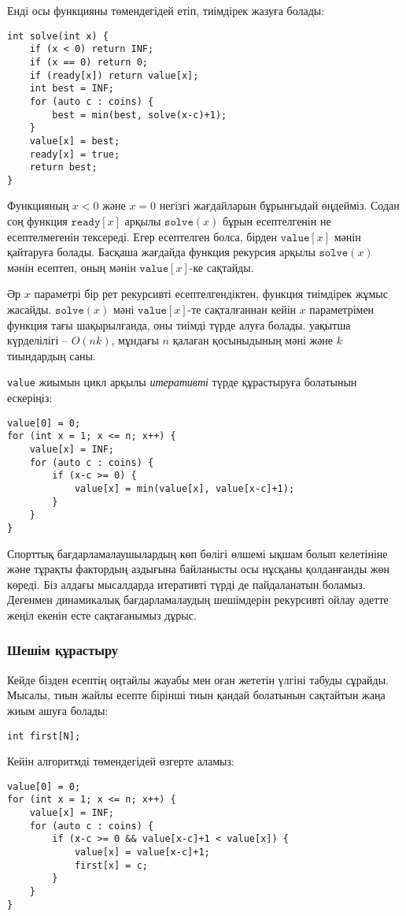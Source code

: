 Енді осы функцияны төмендегідей етіп, тиімдірек
жазуға болады:

\begin{lstlisting}
int solve(int x) {
    if (x < 0) return INF;
    if (x == 0) return 0;
    if (ready[x]) return value[x];
    int best = INF;
    for (auto c : coins) {
        best = min(best, solve(x-c)+1);
    }
    value[x] = best;
    ready[x] = true;
    return best;
}
\end{lstlisting}

Функцияның $x<0$ және $x=0$ негізгі жағдайларын 
бұрынғыдай өңдейміз. Содан соң функция
$\texttt{ready}[x]$ арқылы 
$\texttt{solve}(x)$ бұрын есептелгенін не есептелмегенін тексереді.
Егер есептелген болса, бірден $\texttt{value}[x]$
мәнін қайтаруға болады. Басқаша жағдайда функция рекурсия арқылы
$\texttt{solve}(x)$ мәнін есептеп, оның мәнін 
$\texttt{value}[x]$-ке сақтайды. 

Әр $x$ параметрі бір рет рекурсивті есептелгендіктен,
функция тиімдірек жұмыс жасайды. $\texttt{solve}(x)$ мәні 
$\texttt{value}[x]$-те сақталғаннан кейін
$x$ параметрімен функция тағы шақырылғанда, 
оны тиімді түрде алуға болады. уақытша күрделілігі
-- $O(nk)$, мұндағы $n$ қалаған қосыныдының мәні 
және $k$ тиындардың саны. 

\texttt{value} жиымын 
цикл арқылы \emph{итеративті} түрде
құрастыруға болатынын ескеріңіз:

\begin{lstlisting}
value[0] = 0;
for (int x = 1; x <= n; x++) {
    value[x] = INF;
    for (auto c : coins) {
        if (x-c >= 0) {
            value[x] = min(value[x], value[x-c]+1);
        }
    }
}
\end{lstlisting}

Спорттық бағдарламалаушылардың көп бөлігі өлшемі ықшам болып келетініне және тұрақты фактордың аздығына байланысты 
осы нұсқаны қолданғанды жөн көреді. 
Біз алдағы мысалдарда итеративті түрді де 
пайдаланатын боламыз.
Дегенмен динамикалық бағдарламалаудың шешімдерін 
рекурсивті ойлау әдетте жеңіл екенін есте сақтағанымыз дұрыс.

\subsubsection{Шешім құрастыру}

Кейде бізден есептің оңтайлы жауабы мен 
оған жететін үлгіні табуды сұрайды. 
Мысалы, тиын жайлы есепте бірінші тиын
қандай болатынын сақтайтын жаңа жиым ашуға
болады:
\begin{lstlisting}
int first[N];
\end{lstlisting}
Кейін алгоритмді төмендегідей өзгерте аламыз:
\begin{lstlisting}
value[0] = 0;
for (int x = 1; x <= n; x++) {
    value[x] = INF;
    for (auto c : coins) {
        if (x-c >= 0 && value[x-c]+1 < value[x]) {
            value[x] = value[x-c]+1;
            first[x] = c;
        }
    }
}
\end{lstlisting}

